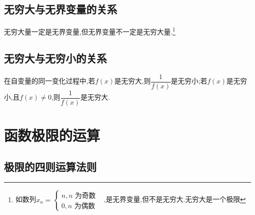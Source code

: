 \documentclass[9pt a4paper, oneside, UTF8]{ctexbook}
\begin{document}
\begin{sloppypar}
    \subsection{无穷大与无界变量的关系}
    无穷大量一定是无界变量,但无界变量不一定是无穷大量.\footnote{如数列$x_n=\begin{cases}n,n\text{ 为奇数}\\0,n\text{ 为偶数}&\end{cases}$,是无界变量,但不是无穷大.无穷大是一个极限}
    \subsection{无穷大与无穷小的关系}
    在自变量的同一变化过程中,若$f(x)$是无穷大,则$\dfrac{1}{f(x)}$是无穷小;若$f(x)$是无穷小,且$f(x)\neq 0$,则$\dfrac{1}{f(x)}$是无穷大.
    \section{函数极限的运算}
    \subsection{极限的四则运算法则}\label{jxdsz1}

\end{sloppypar}
\end{document}
